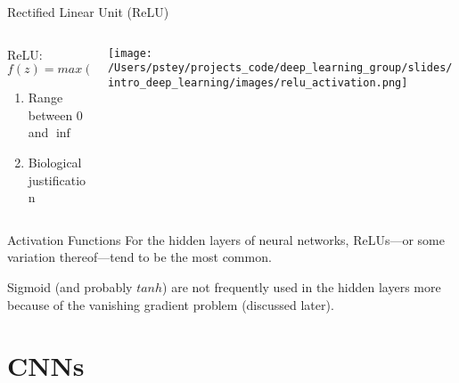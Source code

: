 \documentclass[pdf]{beamer}
\begin{document}
	\begin{frame}{Rectified Linear Unit (ReLU)}
	\begin{columns}
	\begin{column}{0.5\textwidth}
	ReLU: $f(z) = max(0, z)$
	\vspace{1em}
	\begin{enumerate}
		\item Range between 0 and $\inf$
		\item Biological justification	
	\end{enumerate}
	\end{column}
	
	\begin{column}{0.5\textwidth}
	\begin{center}
		\texttt{[image: /Users/pstey/projects\_code/deep\_learning\_group/slides/intro\_deep\_learning/images/relu\_activation.png]}
	\end{center}
	\end{column}
	\end{columns}
	\end{frame}

	
	\begin{frame}{Activation Functions}
	For the hidden layers of neural networks, ReLUs---or some variation thereof---tend to be the most common.
	
	\vspace{2em}
	
	Sigmoid (and probably $tanh$) are not frequently used in the hidden layers more because of the vanishing gradient problem (discussed later).
	\end{frame}



\section{CNNs}
\end{document}
